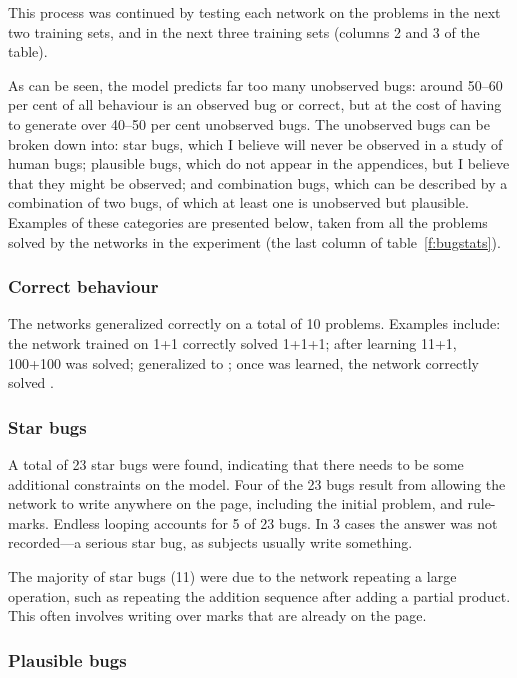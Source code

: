 This process was continued by testing each network on the problems in the
next two training sets, and in the next three training sets (columns 2 and
3 of the table).


As can be seen, the model predicts far too many unobserved bugs: around
50--60 per cent of all behaviour is an observed bug or correct,
but at the cost of having to
generate over 40--50 per cent unobserved bugs.  The unobserved bugs can
be broken down into: star bugs, which I believe will never be observed
in a study of human bugs; plausible bugs, which do not appear in the
appendices, but I believe that they might be observed; and combination
bugs, which can be described by a combination of two bugs,
of which at least one is unobserved but plausible.  Examples of these
categories are presented below, taken from all the problems solved by
the networks in the experiment (the last column of table~\ref{f:bugstats}).

\subsubsection{Correct behaviour}

The networks generalized correctly on a total of 10 problems. Examples
include: the network trained on 1+1 correctly solved 1+1+1; after learning
11+1, 100+100 was solved;  generalized to ; once  was
learned, the network correctly solved .

\subsubsection{Star bugs}

A total of 23 star bugs were found, indicating that there needs to be
some additional constraints on the model.  Four of the 23 bugs result from
allowing the network to write anywhere on the page, including the
initial problem, and rule-marks. Endless looping accounts for 5 of
23 bugs. In 3 cases the answer was not recorded---a serious star bug, as
subjects usually write something.

The majority of star bugs (11) were due to the network repeating a large
operation, such as repeating the addition sequence after
adding a partial product. This
often involves writing over marks that are already on the page.

\subsubsection{Plausible bugs}


